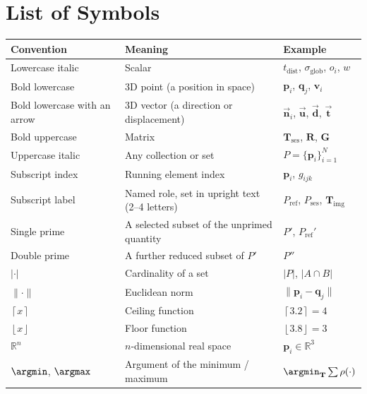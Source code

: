 \chapter{List of Symbols}
\label{ch:notation}

\renewcommand{\arraystretch}{1.3}
\begin{longtable}{@{} p{} p{} p{} @{}}
\toprule
\textbf{Convention} & \textbf{Meaning} & \textbf{Example} \\
\midrule
\endhead
Lowercase italic    & Scalar & $t_\text{dist}$, $\sigma_\text{glob}$, $o_i$, $w$ \\
Bold lowercase      & 3D point (a position in space) & $\mathbf{p}_i$, $\mathbf{q}_j$, $\mathbf{v}_i$ \\
Bold lowercase with an arrow & 3D vector (a direction or displacement) & $\vec{\mathbf{n}}_i$, $\vec{\mathbf{u}}$, $\vec{\mathbf{d}}$, $\vec{\mathbf{t}}$ \\
Bold uppercase      & Matrix & $\mathbf{T}_\text{ses}$, $\mathbf{R}$, $\mathbf{G}$ \\
Uppercase italic    & Any collection or set & $P = \{\mathbf{p}_i\}_{i=1}^{N}$\\
Subscript index     & Running element index & $\mathbf{p}_i$, $g_{ijk}$ \\
Subscript label     & Named role, set in upright text (2--4 letters) & $P_\text{ref}$, $P_\text{ses}$, $\mathbf{T}_\text{img}$ \\
Single prime        & A selected subset of the unprimed quantity & $P'$, $P_\text{ref}'$ \\
Double prime        & A further reduced subset of $P'$ & $P''$ \\
$|\cdot|$           & Cardinality of a set & $|P|$, $|A \cap B|$ \\
$\|\cdot\|$         & Euclidean norm & $\|\mathbf{p}_i - \mathbf{q}_j\|$ \\
$\left\lceil x \right\rceil$ & Ceiling function & $\left\lceil 3.2 \right\rceil = 4$ \\
$\left\lfloor x \right\rfloor$ & Floor function & $\left\lfloor 3.8 \right\rfloor = 3$ \\
$\mathbb{R}^n$      & $n$-dimensional real space & $\mathbf{p}_i \in \mathbb{R}^3$ \\
$\argmin$, $\argmax$ & Argument of the minimum / maximum & $\argmin_{\mathbf{T}} \sum \rho(\cdot)$ \\
\bottomrule
\end{longtable}